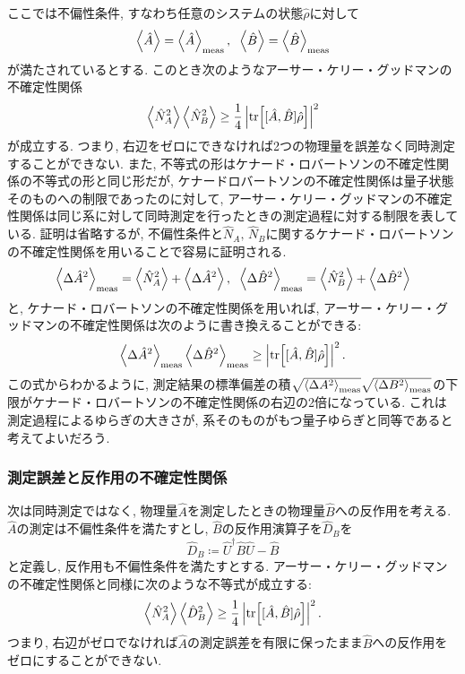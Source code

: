 ここでは不偏性条件, すなわち任意のシステムの状態\(\hat{\rho}\)に対して
\begin{equation}
  \ev{\hat{A}}=\ev{\hat{A}}_{\si{meas}},\hspace{2mm}\ev{\hat{B}}=\ev{\hat{B}}_{\si{meas}}
\end{equation}
が満たされているとする. このとき次のようなアーサー・ケリー・グッドマンの不確定性関係
\begin{equation}
  \ev{\hat{N}^2_A}\ev{\hat{N}^2_B}\geq\frac{1}{4}\left|\tr[[\hat{A},\hat{B}]\hat{\rho}]\right|^2
\end{equation}
が成立する. つまり, 右辺をゼロにできなければ2つの物理量を誤差なく同時測定することができない. また, 不等式の形はケナード・ロバートソンの不確定性関係の不等式の形と同じ形だが, ケナードロバートソンの不確定性関係は量子状態そのものへの制限であったのに対して, アーサー・ケリー・グッドマンの不確定性関係は同じ系に対して同時測定を行ったときの測定過程に対する制限を表している.  証明は省略するが, 不偏性条件と\(\hat{N}_A,\,\hat{N}_B\)に関するケナード・ロバートソンの不確定性関係を用いることで容易に証明される. 
\begin{equation}
  \ev{\Delta \hat{A}^2}_{\si{meas}}=\ev{\hat{N}^2_A}+\ev{\Delta \hat{A}^2},\hspace{2mm}\ev{\Delta \hat{B}^2}_{\si{meas}}=\ev{\hat{N}^2_B}+\ev{\Delta \hat{B}^2}
\end{equation}
と, ケナード・ロバートソンの不確定性関係を用いれば, アーサー・ケリー・グッドマンの不確定性関係は次のように書き換えることができる:
\begin{equation}
  \ev{\Delta \hat{A}^2}_{\si{meas}}\ev{\Delta \hat{B}^2}_{\si{meas}}\geq\left|\tr[[\hat{A},\hat{B}]\hat{\rho}]\right|^2.
\end{equation}
この式からわかるように, 測定結果の標準偏差の積\(\sqrt{\ev{\Delta A^2}_{\si{meas}}}\sqrt{\ev{\Delta B^2}_{\si{meas}}}\)の下限がケナード・ロバートソンの不確定性関係の右辺の2倍になっている. これは測定過程によるゆらぎの大きさが, 系そのものがもつ量子ゆらぎと同等であると考えてよいだろう. 

\subsubsection{測定誤差と反作用の不確定性関係}
次は同時測定ではなく, 物理量\(\hat{A}\)を測定したときの物理量\(\hat{B}\)への反作用を考える. \(\hat{A}\)の測定は不偏性条件を満たすとし, \(\hat{B}\)の反作用演算子を\(\hat{D}_B\)を
\begin{equation}
  \hat{D}_B\coloneqq\hat{U}^\dag\hat{B}\hat{U}-\hat{B}
\end{equation}
と定義し, 反作用も不偏性条件を満たすとする. アーサー・ケリー・グッドマンの不確定性関係と同様に次のような不等式が成立する:
\begin{equation}
   \ev{\hat{N}^2_A}\ev{\hat{D}^2_B}\geq\frac{1}{4}\left|\tr[[\hat{A},\hat{B}]\hat{\rho}]\right|^2.
\end{equation}
つまり, 右辺がゼロでなければ\(\hat{A}\)の測定誤差を有限に保ったまま\(\hat{B}\)への反作用をゼロにすることができない. 

